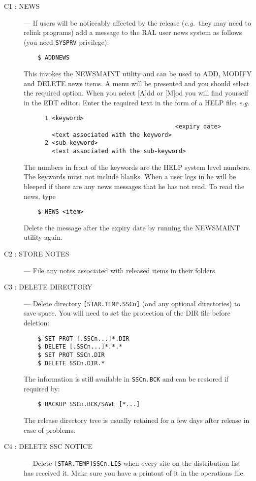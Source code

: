 \begin{description}

\item [C1 : NEWS] ---
If users will be noticeably affected by the release ({\em e.g.}\, they may 
need to relink programs) add a message to the RAL user news system as follows 
(you need {\tt SYSPRV} privilege):
\begin{verbatim}
    $ ADDNEWS
\end{verbatim}
This invokes the NEWSMAINT utility and can be used to ADD, MODIFY and DELETE
news items. A menu will be presented and you should select the required
option.
When you select [A]dd or [M]od you will find yourself in the EDT editor.
Enter the required text in the form of a HELP file; {\em e.g. }
\begin{verbatim}
      1 <keyword>
                                           <expiry date>
        <text associated with the keyword>
      2 <sub-keyword>
        <text associated with the sub-keyword>
\end{verbatim}
The numbers in front of the keywords are the HELP system level numbers.
The keywords must not include blanks.
When a user logs in he will be bleeped if there are any news messages that he
has not read.
To read the news, type
\begin{verbatim}
    $ NEWS <item>
\end{verbatim}
Delete the message after the expiry date by running the NEWSMAINT utility again.

\item [C2 : STORE NOTES] ---
File any notes associated with released items in their folders.

\item [C3 : DELETE DIRECTORY] ---
Delete directory {\tt [STAR.TEMP.SSCn]} (and any optional directories) to save
space.
You will need to set the protection of the DIR file before deletion:
\begin{verbatim}
    $ SET PROT [.SSCn...]*.DIR
    $ DELETE [.SSCn...]*.*.*
    $ SET PROT SSCn.DIR
    $ DELETE SSCn.DIR.*
\end{verbatim}
The information is still available in {\tt SSCn.BCK} and can be restored if
required by:
\begin{verbatim}
    $ BACKUP SSCn.BCK/SAVE [*...]
\end{verbatim}
The release directory tree is usually retained for a few days after release 
in case of problems. 

\item [C4 : DELETE SSC NOTICE] ---
Delete {\tt [STAR.TEMP]SSCn.LIS} when every site on the distribution list has
received it. Make sure you have a printout of it in the operations file.


\end{description}
